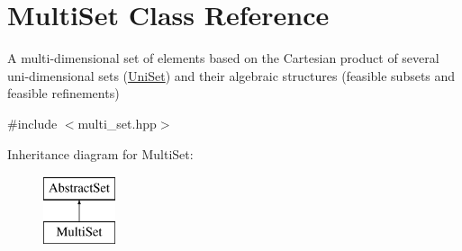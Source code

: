 \hypertarget{classMultiSet}{\section{Multi\-Set Class Reference}
\label{classMultiSet}
}


A multi-\/dimensional set of elements based on the Cartesian product of several uni-\/dimensional sets (\hyperlink{classUniSet}{Uni\-Set}) and their algebraic structures (feasible subsets and feasible refinements)  




{\ttfamily \#include $<$multi\-\_\-set.\-hpp$>$}

Inheritance diagram for Multi\-Set\-:\begin{figure}[H]
\begin{center}
\leavevmode
\includegraphics[height=2.000000cm]{classMultiSet}
\end{center}
\end{figure}
